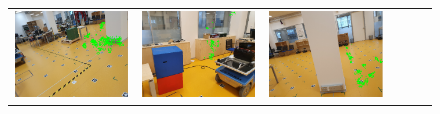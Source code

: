 \documentclass[twoside]{ctuthesis}
\theoremstyle{plain}
\theoremstyle{definition}
\theoremstyle{note}
\begin{document}
{\begin{figure}
{\begin{tabular}{c|c|c|c|c|c}
    \includegraphics[width=\thiswidth]{evaluation/queryPipeline/38.jpg/query_38} & 
    \includegraphics[width=\thiswidth]{evaluation/queryPipeline/16.jpg/query_16} & 
    \includegraphics[width=\thiswidth]{evaluation/queryPipeline/26.jpg/query_26} \\[-1pt]

\end{tabular}}
\end{figure}}
\end{document}
